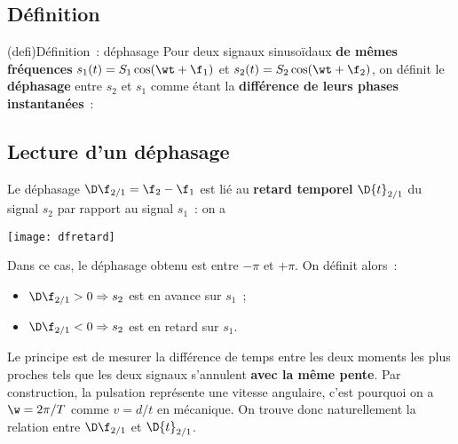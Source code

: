 \documentclass[../../main/main.tex]{subfiles}
\begin{document}
\subsection{Définition}
\begin{tcb}(defi){Définition~: déphasage}
	Pour deux signaux sinusoïdaux \textbf{de mêmes fréquences} $s_1(t) =
		S_1\cos(\wt+\f_1)$ et $s_2(t) = S_2\cos(\wt+\f_2)$, on définit le
	\textbf{déphasage} entre $s_2$ et $s_1$ comme étant la \textbf{différence de
		leurs phases instantanées}~:
	\psw{
		\[
			\D\f_{2/1} = (\wt + \f_2) - (\wt+\f_1)
			\Lra
			\boxed{\D\f_{2/1} = \f_2 - \f_1}
		\]
	}
\end{tcb}

\subsection{Lecture d'un déphasage}

\begin{minipage}{0.65\linewidth}
	Le déphasage $\D\f_{2/1} = \f_2 - \f_1$ est lié au \textbf{retard temporel}
	$\D{t}_{2/1}$ du signal $s_2$ par rapport au signal $s_1$~: on a
	\psw{
		\[\boxed{\D\f_{2/1} = -\w\D{t}_{2/1}}\]
	}
\end{minipage}
\hfill
\begin{minipage}{0.30\linewidth}
	\begin{center}
		\texttt{[image: dfretard]}
	\end{center}
\end{minipage}
Dans ce cas, le déphasage obtenu est entre $-\pi$ et $+\pi$. On définit alors~:
\begin{itemize}
	\item $\D\f_{2/1} > 0 \Rightarrow s_2$ est en avance sur $s_1$~;
	\item $\D\f_{2/1} < 0 \Rightarrow s_2$ est en retard sur $s_1$.
\end{itemize}
Le principe est de mesurer la différence de temps entre les deux moments les
plus proches tels que les deux signaux s'annulent \textbf{avec la même pente}.
Par construction, la pulsation représente une vitesse angulaire, c'est pourquoi
on a $\w = 2\pi/T$ comme $v = d/t$ en mécanique. On trouve donc naturellement la
relation entre $\D\f_{2/1}$ et $\D{t}_{2/1}$.
\end{document}
